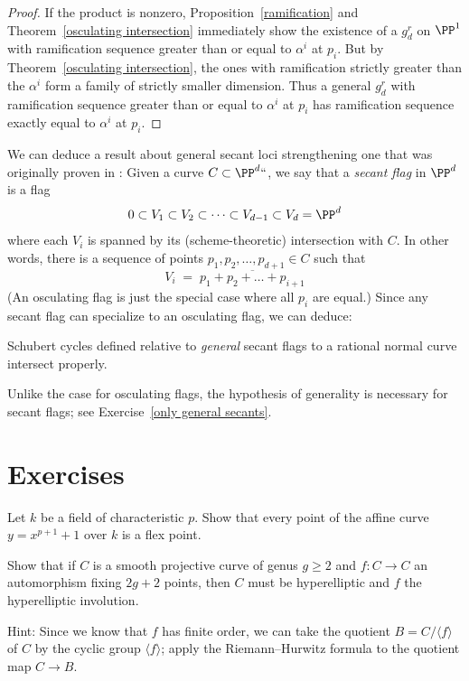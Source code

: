 \begin{proof}
If the product is nonzero, Proposition~\ref{ramification} and
Theorem~\ref{osculating intersection} immediately show the existence of
a $g^r_d$ on $\PP^1$ with ramification sequence greater than or equal
to $\alpha^i$ at $p_i$. But by Theorem~\ref{osculating intersection},
the ones with ramification strictly greater than the $\alpha^i$ form
a family of strictly smaller dimension. Thus a general $g^r_d$ with
ramification sequence greater than or equal to $\alpha^i$ at $p_i$
has  ramification sequence exactly equal to $\alpha^i$ at $p_i$.
\end{proof}

We can deduce a result about general secant loci
%
strengthening one that
was originally proven in \cite{Griffiths-Harris-BN}:
Given a curve $C \subset \PP^d` `$, we say that a \emph{secant flag}
in $\PP^d$ is a flag
$$
0 \subset V_1 \subset V_2 \subset \dots \subset V_{d-1} \subset V_d
= \PP^d
$$
where each $V_i$ is spanned by its (scheme-theoretic) intersection with
$C$. In other words, there is a sequence of points $p_1, p_2, \dots,
p_{d+1} \in C$ such that
$$
V_i \; = \; \overline{p_1+p_2+ \dots + p_{i+1}}
$$
(An osculating flag is just the special case where all $p_i$ are
equal.) Since any secant flag can specialize to an osculating flag,
we can deduce:

\begin{corollary}\label{secant schubert proper}
Schubert cycles defined relative to \emph{general} secant flags to a
rational normal curve intersect properly.
\end{corollary}

Unlike the case for osculating flags, the hypothesis of generality is
necessary for secant flags; see Exercise~\ref{only general secants}.

\section{Exercises}
\begin{exercise}\label{inseparable Gauss}
Let $k$ be a field of 
characteristic $p$.
%
Show that every point of the
affine curve $y = x^{p+1}+1$ over $k$ is a flex point.
\end{exercise}

\begin{exercise}\label{2g+2fixedpoints}
Show that if $C$ is a smooth projective curve of genus $g \geq 2$ and
$f : C \to C$ an automorphism fixing $2g+2$ points, then $C$ must be
hyperelliptic
%
and $f$ the hyperelliptic involution.

Hint: Since we know that $f$ has finite order, we can take the quotient
$B = C/\langle f \rangle$ of $C$ by the cyclic group $\langle f \rangle$;
apply 
the Riemann--Hurwitz formula
%
to the quotient map $C \to B$.
\end{exercise}

